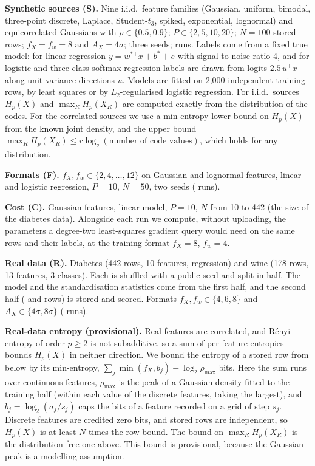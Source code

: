 \documentclass[conference]{IEEEtran}
\theoremstyle{remark}
\begin{document}
\textbf{Synthetic sources (S).} Nine i.i.d.\ feature families (Gaussian, uniform, bimodal,
three-point discrete, Laplace, Student-$t_3$, spiked, exponential, lognormal) and
equicorrelated Gaussians with $\rho\in\{0.5,0.9\}$; $P\in\{2,5,10,20\}$; $N=100$ stored
rows; $f_X=f_w=8$ and $A_X=4\sigma$; three seeds; \NSRuns{} runs. Labels come from a fixed
true model: for linear regression $y=w^{*\top}x+b^*+e$ with signal-to-noise ratio 4, and for
logistic and three-class softmax regression labels are drawn from logits $2.5\,u^\top x$
along unit-variance directions $u$. Models are fitted on 2{,}000 independent training rows,
by least squares or by $L_2$-regularised logistic regression. For i.i.d.\ sources $H_p(X)$
and $\max_R H_p(X_R)$ are computed exactly from the distribution of the codes. For the
correlated sources we use a min-entropy lower bound on $H_p(X)$ from the known joint
density, and the upper bound $\max_R H_p(X_R)\le r\log_q(\text{number of code
values})$, which holds for any distribution.

\textbf{Formats (F).} $f_X,f_w\in\{2,4,\dots,12\}$ on Gaussian and lognormal features,
linear and logistic regression, $P=10$, $N=50$, two seeds (\NFRuns{} runs).

\textbf{Cost (C).} Gaussian features, linear model, $P=10$, $N$ from 10 to 442 (the size of
the diabetes data). Alongside each run we compute, without uploading, the parameters a
degree-two least-squares gradient query would need on the same rows and their labels, at
the training format $f_X=8$, $f_w=4$.

\textbf{Real data (R).} Diabetes \cite{efron2004lars} (442 rows, 10 features, regression)
and wine \cite{uciwine} (178 rows, 13 features, 3 classes). Each is shuffled with a public
seed and split in half. The model and the standardisation statistics come from the first
half, and the second half (\RDiabN{} and \RWineN{} rows) is stored and scored. Formats
$f_X,f_w\in\{4,6,8\}$ and $A_X\in\{4\sigma,8\sigma\}$ (\NRRuns{} runs).

\textbf{Real-data entropy (provisional).} Real features are correlated, and R\'enyi entropy
of order $p\ge2$ is not subadditive, so a sum of per-feature entropies bounds $H_p(X)$ in
neither direction. We bound the entropy of a stored row from below by its min-entropy,
$\sum_j\min(f_X,b_j)-\log_2\rho_{\max}$ bits. Here the sum runs over continuous features,
$\rho_{\max}$ is the peak of a Gaussian density fitted to the training half (within each
value of the discrete features, taking the largest), and $b_j=\log_2(\sigma_j/s_j)$ caps
the bits of a feature recorded on a grid of step $s_j$. Discrete features are credited zero
bits, and stored rows are independent, so $H_p(X)$ is at least $N$ times the row bound. The
bound on $\max_R H_p(X_R)$ is the distribution-free one above.
This bound is provisional, because the Gaussian peak is a modelling assumption.
\end{document}
